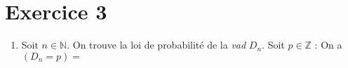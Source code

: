 \section*{Exercice 3}

\begin{enumerate}
  \item Soit $n\in\mathbb{N}$. On trouve la loi de probabilité de la \textit{vad} $D_{n}$. Soit $p \in \mathbb{Z}$ :
        On a $(D_{n} = p) = $
\end{enumerate}

